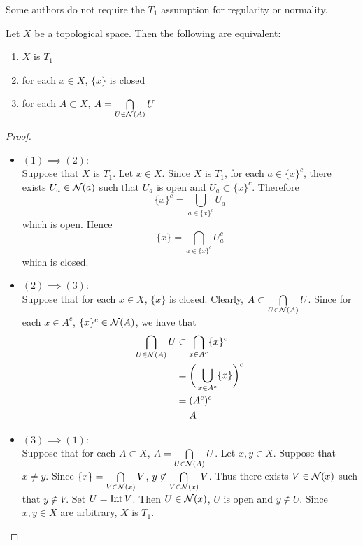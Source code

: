\documentclass{book}
\begin{document}
	\begin{note}
		Some authors do not require the $T_1$ assumption for regularity or normality. 
	\end{note}

	\begin{ex} 
		Let $X$ be a topological space. Then the following are equivalent:
		\begin{enumerate}
			\item $X$ is $T_1$
			\item for each $x \in X$, $\{x\}$ is closed
			\item for each $A \subset X$, $A = \bigcap\limits_{U \in \mathcal{N}(A)} U$
		\end{enumerate}
	\end{ex}
	
	\begin{proof}\
		\begin{itemize}
			\item $(1) \implies (2)$: \\
			Suppose that $X$ is $T_1$. Let $x \in X$. Since $X$ is $T_1$, for each $a \in \{x\}^c$, there exists $U_{a} \in \mathcal{N}(a)$ such that $U_a$ is open and $U_{a} \subset \{x\}^c$. Therefore 
			$$\{x\}^c = \bigcup_{a \in \{x\}^c} U_a$$ 
			which is open. Hence 
			$$\{x\} = \bigcap_{a \in \{x\}^c} U_a^c$$
			which is closed. \\
			\item $(2) \implies (3)$: \\
			Suppose that for each $x \in X$, $\{x\}$ is closed. Clearly, $A \subset \bigcap\limits_{U \in \mathcal{N}(A)} U$. Since for each $x \in A^c$, $\{x\}^c \in \mathcal{N}(A)$, we have that 
			\begin{align*}
				\bigcap_{U \in \mathcal{N}(A)} U
				& \subset \bigcap_{x \in A^c} \{x\}^c \\
				& = \bigg( \bigcup_{x \in A^c} \{x\} \bigg)^c \\
				& = (A^c)^c \\
				& = A
			\end{align*}
			\item $(3) \implies (1)$: \\
			Suppose that for each $A \subset X$, $A = \bigcap\limits_{U \in \mathcal{N}(A)} U$. Let $x, y \in X$. Suppose that $x \neq y$. Since $\{x\} = \bigcap\limits_{V \in \mathcal{N}(x)} V$, $y \not \in  \bigcap\limits_{V \in \mathcal{N}(x)} V$. Thus there exists $V \in \mathcal{N}(x)$ such that $y \not \in V$. Set $U = \operatorname{Int} V$. Then $U \in \mathcal{N}(x)$, $U$ is open and $y \not \in U$. Since $x, y \in X$ are arbitrary, $X$ is $T_1$.
		\end{itemize}
	\end{proof}
\end{document}
